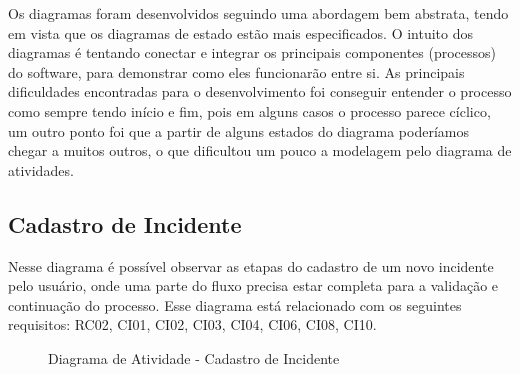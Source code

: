 \documentclass[12pt]{article}
\begin{document}
Os diagramas foram desenvolvidos seguindo uma abordagem bem abstrata, tendo em vista que os diagramas de estado estão mais especificados. O intuito dos diagramas é tentando conectar e integrar os principais componentes (processos) do software, para demonstrar como eles funcionarão entre si. As principais dificuldades encontradas para o desenvolvimento foi conseguir entender o processo como sempre tendo início e fim, pois em alguns casos o processo parece cíclico, um outro ponto foi que a partir de alguns estados do diagrama poderíamos chegar a muitos outros, o que dificultou um pouco a modelagem pelo diagrama de atividades.

\subsection{Cadastro de Incidente}

Nesse diagrama é possível observar as etapas do cadastro de um novo incidente pelo usuário, onde uma parte do fluxo precisa estar completa para a validação e continuação do processo. Esse diagrama está relacionado com os seguintes requisitos: RC02, CI01, CI02, CI03, CI04, CI06, CI08, CI10.

  \begin{figure}[!htb]
    \caption{\label{fig:diagCadastroInci} Diagrama de Atividade - Cadastro de Incidente}
  \end{figure}

\vfill%
\pagebreak%
\end{document}
